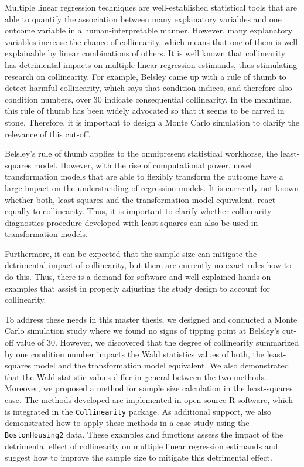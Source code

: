 \documentclass[11pt,a4paper,twoside]{book}\usepackage[]{graphicx}\usepackage[]{xcolor}
\begin{document}
Multiple linear regression techniques are well-established statistical tools that are able to quantify the association between many explanatory variables and one outcome variable in a human-interpretable manner.
However, many explanatory variables increase the chance of collinearity, which means that one of them is well explainable by linear combinations of others.
It is well known that collinearity has detrimental impacts on multiple linear regression estimands, thus stimulating research on collinearity.
For example, Belsley came up with a rule of thumb to detect harmful collinearity, which says that condition indices, and therefore also condition numbers, over 30 indicate consequential collinearity.
In the meantime, this rule of thumb has been widely advocated so that it seems to be carved in stone.
Therefore, it is important to design a Monte Carlo simulation to clarify the relevance of this cut-off.

Belsley's rule of thumb applies to the omnipresent statistical workhorse, the least-squares model.
However, with the rise of computational power, novel transformation models that are able to flexibly transform the outcome have a large impact on the understanding of regression models.
It is currently not known whether both, least-squares and the transformation model equivalent, react equally to collinearity.
Thus, it is important to clarify whether collinearity diagnostics procedure developed with least-squares can also be used in transformation models.

Furthermore, it can be expected that the sample size can mitigate the detrimental impact of collinearity, but there are currently no exact rules how to do this.
Thus, there is a demand for software and well-explained hands-on examples that assist in properly adjusting the study design to account for collinearity.

To address these needs in this master thesis, we designed and conducted a Monte Carlo simulation study where we found no signs of tipping point at Belsley's cut-off value of 30.
However, we discovered that the degree of collinearity summarized by one condition number impacts the Wald statistics values of both, the least-squares model and the transformation model equivalent.
We also demonstrated that the Wald statistic values differ in general between the two methods.
Moreover, we proposed a method for sample size calculation in the least-squares case.
The methods developed are implemented in open-source \textsf{R} software, which is integrated in the \texttt{Collinearity} package.
As additional support, we also demonstrated how to apply these methods in a case study using the \texttt{BostonHousing2} data.
These examples and functions assess the impact of the detrimental effect of collinearity on multiple linear regression estimands and suggest how to improve the sample size to mitigate this detrimental effect.
\end{document}
